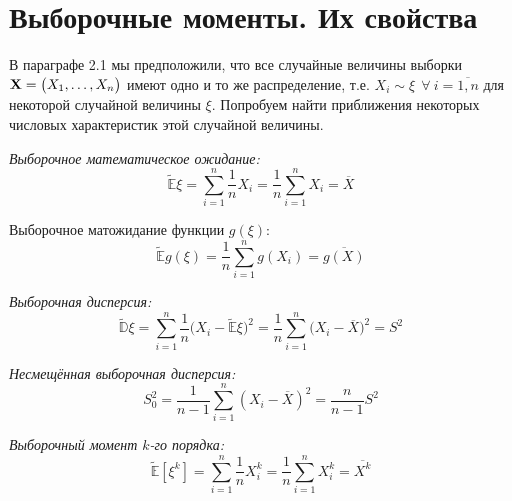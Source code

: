 \section{Выборочные моменты. Их свойства}

В параграфе 2.1 мы предположили, что все случайные величины выборки $\mathbf{X} = \bigl( X_1, \ldots, X_n \bigr)$ имеют одно и то же распределение, т.е. $X_i \sim \xi~~\forall~i = \overline{1, n}$ для некоторой случайной величины $\xi$. 
Попробуем найти приближения некоторых числовых характеристик этой случайной величины.
\begin{defn}
    \textit{Выборочное математическое ожидание:} 
    \begin{equation*}
        \tilde{\mathbb{E}} \xi =
        \sum\limits_{i=1}^{n} \frac{1}{n} X_{i} =
        \frac{1}{n} \sum\limits_{i=1}^{n} X_{i} =
        \overline{X}
    \end{equation*}

    Выборочное матожидание функции $g(\xi)$:
    \begin{equation*}
        \tilde{\mathbb{E}} g\left(\xi \right) = 
        \frac{1}{n} \sum\limits_{i=1}^{n} g\left(X_{i}\right) =
        \overline{g(X)}
    \end{equation*}
\end{defn}

\begin{defn}
    \textit{Выборочная дисперсия:}
    \begin{equation*}
        \tilde{\mathbb{D}} \xi = 
        \sum\limits_{i=1}^{n} \frac{1}{n} \bigl(X_{i}-\tilde{\mathbb{E}} \xi \bigr)^{2} = 
        \frac{1}{n} \sum\limits_{i=1}^{n} \bigl(X_{i}-\overline{X} \bigr)^{2} =
        S^{2}
    \end{equation*}
\end{defn}

\begin{defn}
    \textit{Несмещённая выборочная дисперсия:} 
    \begin{equation*}
        S_{0}^{2} = 
        \frac{1}{n-1} \sum\limits_{i=1}^{n}\left(X_{i}-\overline{X}\right)^{2} =
        \frac{n}{n-1} S^2
    \end{equation*}
\end{defn}

\begin{defn}
    \textit{Выборочный момент $k$-го порядка:}
    \begin{equation*}
        \tilde{\mathbb{E}} \left[ \xi^{k} \right] = 
        \sum\limits_{i=1}^{n} \frac{1}{n} X_{i}^{k} =
        \frac{1}{n} \sum\limits_{i=1}^{n} X_{i}^{k} =
        \overline{X^{k}}
    \end{equation*}
\end{defn}

